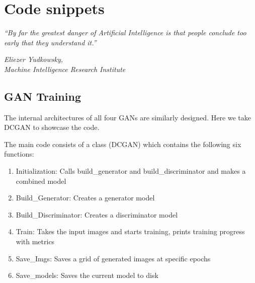 {\chapter{Code snippets}\label{ch:scope}}
\epigraph{\textit{\normalsize “By far the greatest danger of Artificial Intelligence is that people conclude too early that they understand it.”}}{\textit{ \normalsize Eliezer Yudkowsky,\\ Machine Intelligence Research Institute}}


\section{GAN Training} %
\label{sec:gan_training}
The internal architectures of all four GANs are similarly designed. Here we take DCGAN to showcase the code.

\par\bigskip 
The main code consists of a class (DCGAN) which contains the following six functions:
\par\bigskip

\begin{enumerate}
    \item Initialization: Calls build\_generator and build\_discriminator and makes a combined model
    \item Build\_Generator: Creates a generator model
    \item Build\_Discriminator: Creates a discriminator model
    \item Train: Takes the input images and starts training, prints training progress with metrics
    \item Save\_Imgs: Saves a grid of generated images at specific epochs
    \item Save\_models: Saves the current model to disk
\end{enumerate}

